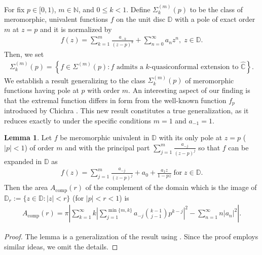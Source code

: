 \documentclass[a4paper,12pt]{amsart}
\theoremstyle{plain}
\theoremstyle{definition}
\newtheorem{lem}{Lemma}[section]
\newcounter {own}
\begin{document}
For fix $p \in [0,1)$, $m \in \mathbb{N}$, and $0 \leq k < 1$. Define 
$\Sigma^{(m)}_k(p)$ to be the class of meromorphic, univalent functions 
$f$ on the unit disc $\mathbb{D}$ with a pole of exact order $m$ at $z=p$ 
and it is normalized by 
\begin{align}\label{Eq-11.22}
	f(z) = \sum_{k=1}^{m}\frac{a_{-k}}{(z-p)^k} + \sum_{n=0}^{\infty} a_n z^n,
\; z \in \mathbb{D}.
\end{align}
Then, we set
\begin{align*}
	\Sigma^{(m)}_k(p) = 
	\left\{ f \in \Sigma^{(m)}(p) : 
	f \text{ admits a $k$-quasiconformal extension to } \widehat{\mathbb{C}}
	\right\}.
\end{align*}
We establish a result generalizing \cite[Theorem 1]{Bhowmik-PAMS-2016} to the class $\Sigma_k^{(m)}(p)$ of meromorphic functions having pole at $p$ with order $m$. An interesting aspect of our finding is that the extremal function differs in form from the well-known function $f_p$ introduced by Chichra \cite[Lemma, p. 317]{Chichra1969}. This new result constitutes a true generalization, as it reduces exactly to \cite[Theorem 1]{Bhowmik-PAMS-2016} under the specific conditions $m=1$ and $a_{-1}=1$.
\begin{lem}\label{Lem-2.1}
	Let $f$ be meromorphic univalent in $\mathbb{D}$ with its only pole at $z=p$ ($|p|<1$) of order $m$ and with the principal part $\sum_{j=1}^{m}\frac{a_{-j}}{(z-p)^j}$ so that $f$ can be expanded in $\mathbb{D}$ as 
	\begin{align*}
		f(z) = \sum_{j=1}^{m}\frac{a_{-j}}{(z-p)^j} + a_0 + \frac{a_1 z}{1 - p z}\; \mbox{for}\; z\in\mathbb{D}.
	\end{align*}
	Then the area $A_{\text{comp}}(r)$ of the complement of the domain which is the image of $\mathbb{D}_r:=\{z\in\mathbb{D} : |z|<r\}$ (for $|p|<r<1$) is
	\begin{align}\label{Eq-22.44}
		A_{\text{comp}}(r) = \pi \left| \sum_{k=1}^{\infty} k \left| \sum_{j=1}^{\min\{m, k\}} a_{-j} \binom{k-1}{j-1} p^{k-j} \right|^2- \sum_{n=1}^{\infty} n |a_{n}|^2 \right|.
	\end{align}
\end{lem}
\begin{proof}
	The lemma is a generalization of the result using \cite[Lemma 1.1, p. 2]{Hayman-1958}. Since the proof employs similar ideas, we omit the details.
\end{proof}
\end{document}
